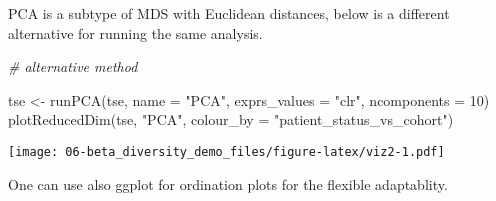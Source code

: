 \documentclass[
  oneside]{book}
\newenvironment{Shaded}{\begin{snugshade}}{\end{snugshade}}
\newcommand{\AttributeTok}[1]{\textcolor[rgb]{0.77,0.63,0.00}{#1}}
\newcommand{\CommentTok}[1]{\textcolor[rgb]{0.56,0.35,0.01}{\textit{#1}}}
\newcommand{\DecValTok}[1]{\textcolor[rgb]{0.00,0.00,0.81}{#1}}
\newcommand{\FunctionTok}[1]{\textcolor[rgb]{0.00,0.00,0.00}{#1}}
\newcommand{\NormalTok}[1]{#1}
\newcommand{\OtherTok}[1]{\textcolor[rgb]{0.56,0.35,0.01}{#1}}
\newcommand{\StringTok}[1]{\textcolor[rgb]{0.31,0.60,0.02}{#1}}
\begin{document}
PCA is a subtype of MDS with Euclidean distances, below is a different alternative for running the same analysis.

\begin{Shaded}
\begin{Highlighting}[]
\CommentTok{\# alternative method }

\NormalTok{tse }\OtherTok{\textless{}{-}} \FunctionTok{runPCA}\NormalTok{(tse, }\AttributeTok{name =} \StringTok{"PCA"}\NormalTok{, }\AttributeTok{exprs\_values =} \StringTok{"clr"}\NormalTok{, }\AttributeTok{ncomponents =} \DecValTok{10}\NormalTok{)}
\FunctionTok{plotReducedDim}\NormalTok{(tse, }\StringTok{"PCA"}\NormalTok{, }\AttributeTok{colour\_by =} \StringTok{"patient\_status\_vs\_cohort"}\NormalTok{)}
\end{Highlighting}
\end{Shaded}

\texttt{[image: 06-beta\_diversity\_demo\_files/figure-latex/viz2-1.pdf]}

One can use also ggplot for ordination plots for the flexible adaptablity.
\end{document}
